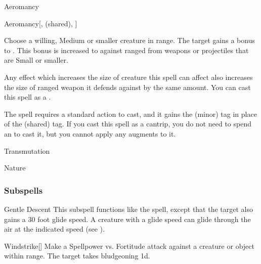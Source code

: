 
\begin{spellsection}{Aeromancy}

\begin{spellheader}
\end{spellheader}


\begin{ability}{Aeromancy}[,  (shared), ]

Choose a willing, Medium or smaller creature in \rngclose range.
The target gains a  bonus to .
This bonus is increased to  against ranged  from weapons or projectiles that are Small or smaller.

Any effect which increases the size of creature this spell can affect also increases the size of ranged weapon it defends against by the same amount.
You can cast this spell as a .

\end{ability}



 The spell requires a standard action to cast, and it gains the  (minor) tag in place of the  (shared) tag. If you cast this spell as a cantrip,
you do not need to spend an  to cast it,
but you cannot apply any augments to it.


 Transmutation

 Nature
\end{spellsection}


\subsubsection{Subspells}


\begin{ability}[\nth{2}]{Gentle Descent}
This subspell functions like the  spell, except that the target also gains a 30 foot glide speed.
A creature with a glide speed can glide through the air at the indicated speed (see ).
\end{ability}
\vspace{0.25em}


\begin{ability}[\nth{2}]{Windstrike}[]
Make a Spellpower vs. Fortitude attack against a creature or object within \rngmed range.
\hit The target takes bludgeoning  \plus1d.
\end{ability}
\vspace{0.25em}



